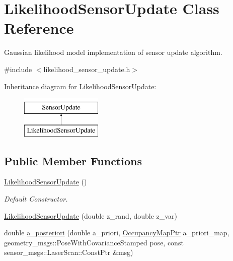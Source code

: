 \hypertarget{classLikelihoodSensorUpdate}{\section{Likelihood\-Sensor\-Update Class Reference}
\label{classLikelihoodSensorUpdate}
}


Gaussian likelihood model implementation of sensor update algorithm.  




{\ttfamily \#include $<$likelihood\-\_\-sensor\-\_\-update.\-h$>$}

Inheritance diagram for Likelihood\-Sensor\-Update\-:\begin{figure}[H]
\begin{center}
\leavevmode
\includegraphics[height=2.000000cm]{classLikelihoodSensorUpdate}
\end{center}
\end{figure}
\subsection*{Public Member Functions}
\begin{DoxyCompactItemize}
\item 
\hypertarget{classLikelihoodSensorUpdate_a60424de72efee82d70d13061dcb65ae2}{\hyperlink{classLikelihoodSensorUpdate_a60424de72efee82d70d13061dcb65ae2}{Likelihood\-Sensor\-Update} ()}\label{classLikelihoodSensorUpdate_a60424de72efee82d70d13061dcb65ae2}

\begin{DoxyCompactList}\small\item\em Default Constructor. \end{DoxyCompactList}\item 
\hyperlink{classLikelihoodSensorUpdate_a342698e21192ccbab6cfbdec8fae0e46}{Likelihood\-Sensor\-Update} (double z\-\_\-rand, double z\-\_\-var)
\item 
double \hyperlink{classLikelihoodSensorUpdate_aa7a4eaae56fb86af98f428b598f46962}{a\-\_\-posteriori} (double a\-\_\-priori, \hyperlink{occupancy__map_8h_aea86d1b633e7d9b44b660a39fa9b50f7}{Occupancy\-Map\-Ptr} a\-\_\-priori\-\_\-map, geometry\-\_\-msgs\-::\-Pose\-With\-Covariance\-Stamped pose, const sensor\-\_\-msgs\-::\-Laser\-Scan\-::\-Const\-Ptr \&msg)
\end{DoxyCompactItemize}
